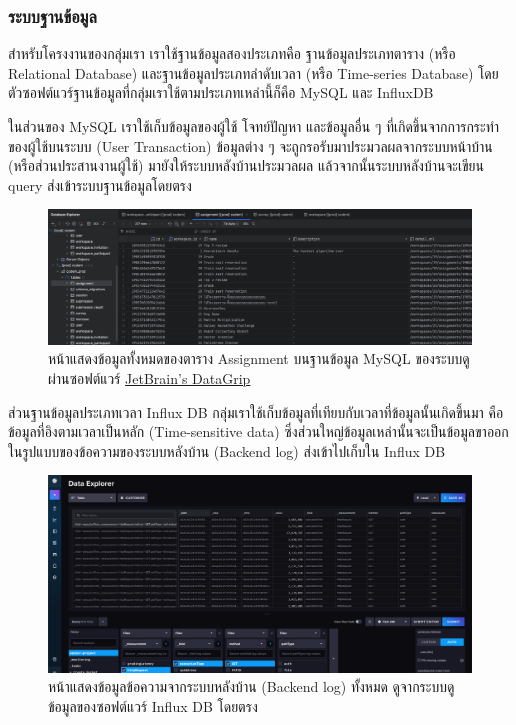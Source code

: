 \documentclass[12pt,one side,openright,a4paper]{cpe-thesis-th}
\newcommand{\thaijustify}[1]{%
  \par\hspace{30pt}\justifying
  #1
}
\begin{document}
\subsubsection{ระบบฐานข้อมูล}
\thaijustify{
  สำหรับโครงงานของกลุ่มเรา เราใช้ฐานข้อมูลสองประเภทคือ ฐานข้อมูลประเภทตาราง (หรือ Relational Database) และฐานข้อมูลประเภทลำดับเวลา (หรือ Time-series Database) โดยตัวซอฟต์แวร์ฐานข้อมูลที่กลุ่มเราใช้ตามประเภทเหล่านี้ก็คือ MySQL และ InfluxDB
}
\thaijustify{
  ในส่วนของ MySQL เราใช้เก็บข้อมูลของผู้ใช้ โจทย์ปัญหา และข้อมูลอื่น ๆ ที่เกิดขึ้นจากการกระทำของผู้ใช้บนระบบ (User Transaction) ข้อมูลต่าง ๆ จะถูกรอรับมาประมวลผลจากระบบหน้าบ้าน (หรือส่วนประสานงานผู้ใช้) มายังให้ระบบหลังบ้านประมวลผล แล้วจากนั้นระบบหลังบ้านจะเขียน query ส่งเข้าระบบฐานข้อมูลโดยตรง
}
\begin{figure}[H]
  \centering
  \includegraphics[width=12cm]{figure/results/datagrip.png}
  \caption[ระบบฐานข้อมูล MySQL ดูผ่าน DataGrip]{หน้าแสดงข้อมูลทั้งหมดของตาราง Assignment บนฐานข้อมูล MySQL ของระบบดูผ่านซอฟต์แวร์ \href{https://www.jetbrains.com/datagrip}{JetBrain's DataGrip}}
  \label{fig:res-datagrip}
\end{figure}
\thaijustify{
  ส่วนฐานข้อมูลประเภทเวลา Influx DB กลุ่มเราใช้เก็บข้อมูลที่เทียบกับเวลาที่ข้อมูลนั้นเกิดขึ้นมา คือข้อมูลที่อิงตามเวลาเป็นหลัก (Time-sensitive data) ซึ่งส่วนใหญ่ข้อมูลเหล่านั้นจะเป็นข้อมูลขาออกในรูปแบบของข้อความของระบบหลังบ้าน (Backend log) ส่งเข้าไปเก็บใน Influx DB
}
\begin{figure}[H]
  \centering
  \includegraphics[width=12cm]{figure/results/influx.png}
  \caption[ระบบฐานข้อมูล Influx DB]{หน้าแสดงข้อมูลข้อความจากระบบหลังบ้าน (Backend log) ทั้งหมด ดูจากระบบดูข้อมูลของซอฟต์แวร์ Influx DB โดยตรง}
  \label{fig:res-influx}
\end{figure}
\end{document}
